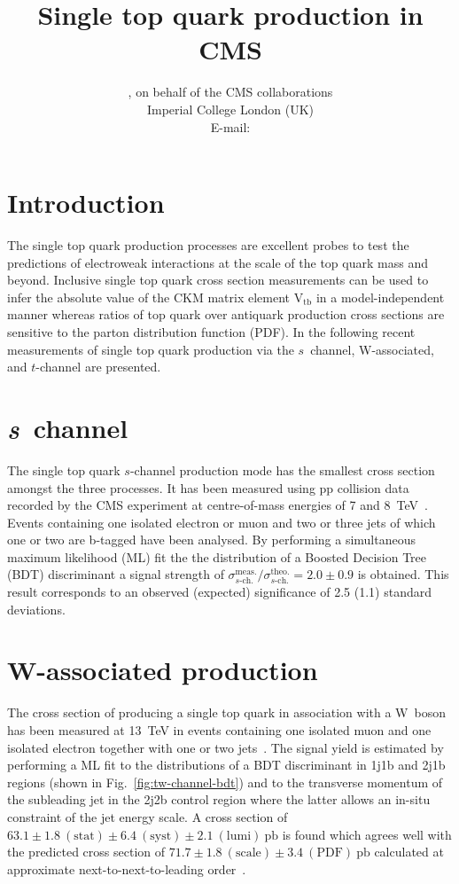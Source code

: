 \documentclass{PoS}
\title{Single top quark production in CMS}
\author{
    \speaker{Matthias Komm}, on behalf of the CMS collaborations\\
    Imperial College London (UK)\\
    E-mail: \email{Matthias.Komm@cern.ch}
}
\begin{document}
\section{Introduction}
The single top quark production processes are excellent probes to test the predictions of electroweak interactions at the scale of the top quark mass and beyond. Inclusive single top quark cross section measurements can be used to infer the absolute value of the CKM matrix element $\mathrm{V}_\mathrm{tb}$ in a model-independent manner whereas  ratios of top quark over antiquark production cross sections are sensitive to the parton distribution function (PDF). In the following recent measurements of single top quark production via the $s$~channel, W-associated, and $t$-channel are presented.

\section{\textit{s}~channel}

The single top quark $s$-channel production mode has the smallest cross section amongst the three processes. It has been measured using pp collision data recorded by the CMS experiment at centre-of-mass energies of 7 and 8~TeV~\cite{sch}. Events containing one isolated electron or muon and two or three jets of which one or two are b-tagged have been analysed. By performing a simultaneous maximum likelihood (ML) fit the the distribution of a Boosted Decision Tree (BDT) discriminant a signal strength of $\sigma^\mathrm{meas.}_{s\mbox{-}\mathrm{ch.}}/\sigma^\mathrm{theo.}_{s\mbox{-}\mathrm{ch.}}=2.0\pm0.9$ is obtained. This result corresponds to an observed (expected) significance of 2.5 (1.1) standard deviations.


\section{W-associated production}

The cross section of producing a single top quark in association with a W~boson has been measured at 13~TeV in events containing one isolated muon and one isolated electron together with one or two jets~\cite{tWch}. The signal yield is estimated by performing a ML fit to the distributions of a BDT discriminant in 1j1b and 2j1b regions (shown in Fig.~\ref{fig:tw-channel-bdt}) and to the transverse momentum of the subleading jet in the 2j2b control region where the latter allows an in-situ constraint of the jet energy scale. A cross section of $63.1\pm1.8~\mathrm{(stat)}\pm6.4~\mathrm{(syst)}\pm2.1~\mathrm{(lumi)}~\mathrm{pb}$ is found which agrees well with the predicted cross section of $71.7\pm1.8~\mathrm{(scale)}\pm3.4~\mathrm{(PDF)}~\mathrm{pb}$ calculated at approximate next-to-next-to-leading order~\cite{tw-xsec}.
\end{document}
